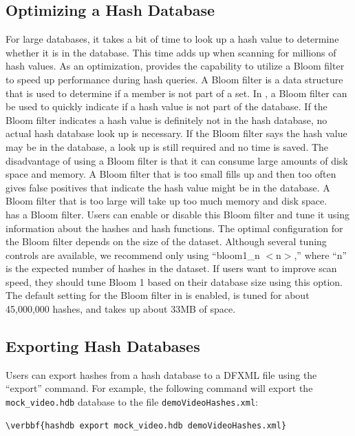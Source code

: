 \documentclass[11pt,fleqn]{article} %
\begin{document}
\subsection{Optimizing a Hash Database}
\label{optimizing}
 
For large databases, it takes a bit of time to look up a hash value to determine whether it is in the database. This time adds up when scanning for millions of hash values. As an optimization, \hdb provides the capability to utilize a Bloom filter to speed up performance during hash queries. A Bloom filter is a data structure that is used to determine if a member is not part of a set. In \hdb, a Bloom filter can be used to quickly indicate if a hash value is not part of the database. If the Bloom filter indicates a hash value is definitely not in the hash database, no actual hash database look up is necessary. If the Bloom filter says the hash value may be in the database, a look up is still required and no time is saved. The disadvantage of using a Bloom filter is that it can consume large amounts of disk space and memory. A Bloom filter that is too small fills up and then too often gives false positives that indicate the hash value might be in the database. A Bloom filter that is too large will take up too much memory and disk space.\\

\hdb has a Bloom filter.  Users can enable or disable this Bloom filter and tune it using information about the hashes and hash functions. The optimal configuration for the Bloom filter depends on the size of the dataset. Although several tuning controls are available, we recommend only using ``bloom1\_n $<$n$>$,'' where ``n'' is the expected number of hashes in the dataset. If users want to improve scan speed, they should tune Bloom 1 based on their database size using this option. The default setting for the Bloom filter in \hdb is enabled, is tuned for about 45,000,000 hashes, and takes up about 33MB of space. 

\subsection{Exporting Hash Databases}
Users can export hashes from a hash database to a DFXML file using the ``export'' command. For example, the following command will export the \texttt{mock\_video.hdb} database to the file \texttt{demoVideoHashes.xml}:
\begin{Verbatim}[commandchars=\\\{\}]
\verbbf{hashdb export mock_video.hdb demoVideoHashes.xml}
\end{Verbatim}
\end{document}
